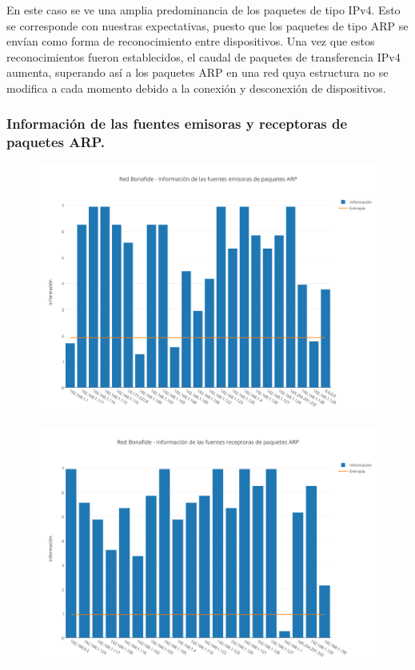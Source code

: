 En este caso se ve una amplia predominancia de los paquetes de tipo IPv4. Esto se corresponde con nuestras expectativas, puesto que los paquetes de tipo ARP se envían como forma de reconocimiento entre dispositivos. Una vez que estos reconocimientos fueron establecidos, el caudal de paquetes de transferencia IPv4 aumenta, superando así a los paquetes ARP en una red quya estructura no se modifica a cada momento debido a la conexión y desconexión de dispositivos.

\subsubsection{Informaci\'on de las fuentes emisoras y receptoras de paquetes ARP.}

\begin{figure}[h!]
    \centering                                                       
    \includegraphics[width=400pt]{img/RedBonafideFuentesEmisorasARP}
    \caption{}
    \label{bonafideEmisoras}
\end{figure}

\begin{figure}[h!]
    \centering                                                       
    \includegraphics[width=400pt]{img/RedBonafideFuentesReceptorasARP}
    \caption{}
    \label{bonafideReceptoras}
\end{figure}

